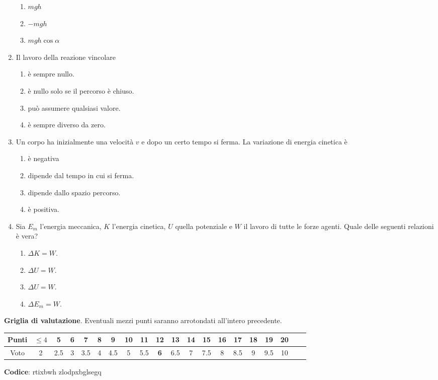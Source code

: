 \documentclass{article}
\begin{document}
\begin{enumerate}
\begin{enumerate}[label=\Alph*.]
    \item $mgh$
    \item $-mgh$
    \item $mgh\cos\alpha$
  \end{enumerate}
  \item Il lavoro della reazione vincolare
  \begin{enumerate}[label=\Alph*.]
    \item è sempre nullo.
    \item è nullo solo se il percorso è chiuso.
    \item può assumere qualsiasi valore.
    \item è sempre diverso da zero.
  \end{enumerate}
  \item Un corpo ha inizialmente una velocità $v$ e dopo un certo tempo si ferma. La variazione di energia cinetica è
  \begin{enumerate}[label=\Alph*.]
    \item è negativa
    \item dipende dal tempo in cui si ferma.
    \item dipende dallo spazio percorso.
    \item è positiva.
  \end{enumerate}
  \item Sia $E_m$ l'energia meccanica, $K$ l'energia cinetica, $U$ quella potenziale e $W$ il lavoro di tutte le forze agenti. Quale delle seguenti relazioni è vera?
  \begin{enumerate}[label=\Alph*.]
    \item $\Delta K=W.$
    \item $\Delta U=W$.
    \item $\Delta U=W$.
    \item $\Delta E_m=W$.
  \end{enumerate}
\end{enumerate}








\newpage \maketitle \centering \textbf{Griglia di valutazione}. Eventuali mezzi punti saranno arrotondati all'intero precedente. \begin{table}[h]     \centering \begin{tabular}{|c|c|c|c|c|c|c|c|c|c|c|c|c|c|c|c|c|c|c|c|} \hline Punti &  $\leq 4$ & 5 & 6 & 7 & 8 & 9 & 10 & 11 & \textbf{12} & 13 & 14 & 15 & 16 & 17 & 18 & 19 & 20 \\ \hline Voto & 2 & 2.5 & 3 & 3.5 & 4 & 4.5 & 5 & 5.5 & \textbf{6} & 6.5 & 7 & 7.5 & 8 & 8.5 & 9 & 9.5 & 10 \\ \hline \end{tabular} \end{table}
\textbf{Codice}: rtixbwh zlodpxbglsegq
\end{document}
